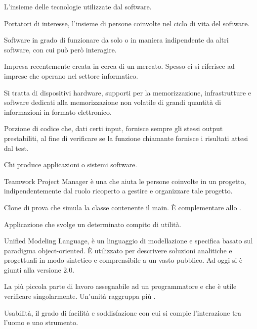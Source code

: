 L'insieme delle tecnologie utilizzate dal software.

Portatori di interesse, l'insieme di persone coinvolte nel ciclo di vita del software.

Software in grado di funzionare da solo o in maniera indipendente da altri software, con cui può però interagire.

Impresa recentemente creata in cerca di un mercato. Spesso ci si riferisce ad imprese che operano nel settore informatico.

Si tratta di dispositivi hardware, supporti per la memorizzazione, infrastrutture e software dedicati alla memorizzazione non volatile di grandi quantità di informazioni in formato elettronico.

Porzione di codice che, dati certi input, fornisce sempre gli stessi output prestabiliti, al fine di verificare se la funzione chiamante fornisce i risultati attesi dal test.

Chi produce applicazioni o sistemi software.


Teamwork Project Manager è una  che aiuta le persone coinvolte in un progetto, indipendentemente dal ruolo ricoperto a gestire e organizzare tale progetto.

Clone di prova che simula la classe contenente il main. È complementare allo .

Applicazione che svolge un determinato compito di utilità.


Unified Modeling Language, è un linguaggio di modellazione e specifica basato sul paradigma object-oriented. 
È utilizzato per descrivere soluzioni analitiche e progettuali in modo sintetico e comprensibile a un vasto pubblico.
Ad oggi si è giunti alla versione 2.0.

La più piccola parte di lavoro assegnabile ad un programmatore e che è utile verificare singolarmente. Un'unità raggruppa più .

Usabilità, il grado di facilità e soddisfazione con cui si compie l'interazione tra l'uomo e uno strumento.

